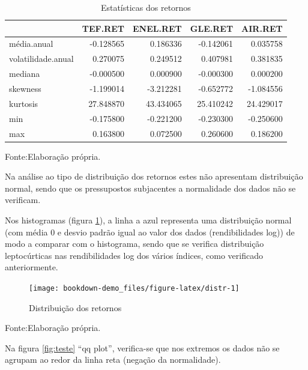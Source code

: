 \documentclass[
  12pt,
  a4paper,
  openany]{book}
\begin{document}
\begin{table}[!h]

\caption{\label{tab:statret}Estatísticas dos retornos}
\centering
\begin{tabular}[t]{lrrrr}
\toprule
  & TEF.RET & ENEL.RET & GLE.RET & AIR.RET\\
\midrule
média.anual & -0.128565 & 0.186336 & -0.142061 & 0.035758\\
volatilidade.anual & 0.270075 & 0.249512 & 0.407981 & 0.381835\\
mediana & -0.000500 & 0.000900 & -0.000300 & 0.000200\\
skewness & -1.199014 & -3.212281 & -0.652772 & -1.084556\\
kurtosis & 27.848870 & 43.434065 & 25.410242 & 24.429017\\
\addlinespace
min & -0.175800 & -0.221200 & -0.230300 & -0.250600\\
max & 0.163800 & 0.072500 & 0.260600 & 0.186200\\
\bottomrule
\end{tabular}
\end{table}
\FloatBarrier
\centering

Fonte:Elaboração própria.

\justifying
\bigskip

Na análise ao tipo de distribuição dos retornos estes não apresentam distribuição normal, sendo que os pressupostos subjacentes a normalidade dos dados não se verificam.

Nos histogramas (figura \ref{fig:distr}), a linha a azul representa uma distribuição normal (com média 0 e desvio padrão igual ao valor dos dados (rendibilidades log)) de modo a comparar com o histograma, sendo que se verifica distribuição leptocúrticas nas rendibilidades log dos vários índices, como verificado anteriormente.

\begin{figure}

{\centering \texttt{[image: bookdown-demo\_files/figure-latex/distr-1]} 

}

\caption{Distribuição dos retornos}\label{fig:distr}
\end{figure}
\FloatBarrier
\centering

Fonte:Elaboração própria.

\justifying

Na figura \ref{fig:teste} ``qq plot'', verifica-se que nos extremos os dados não se agrupam ao redor da linha reta (negação da normalidade).
\end{document}
